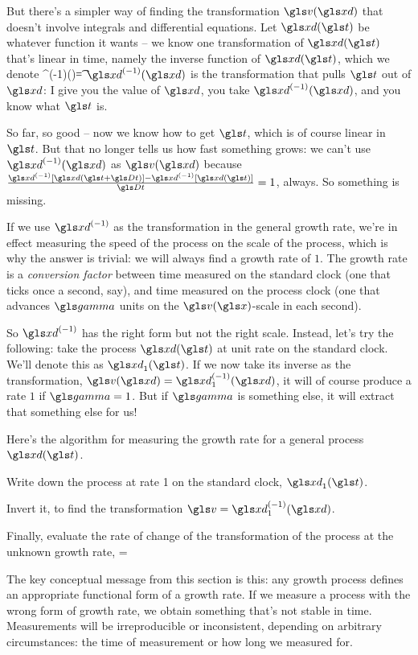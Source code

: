 But there's a simpler way of finding the transformation $\gv(\xd)$ that doesn't involve integrals and differential 
equations. Let $\xd(\t)$ be whatever function it wants -- we know one transformation of $\xd(\t)$ that's linear in 
time, namely the inverse function of $\xd(\t)$, which we denote 
\be
\xd^{(-1)}(\xd)=\t
\ee
$\xd^{(-1)}(\xd)$ is the transformation that pulls $\t$ out of $\xd$: I give you the value of $\xd$, you take 
$\xd^{(-1)}(\xd)$, and you know what $\t$ is.

So far, so good -- now we know how to get $\t$, which is of course linear in $\t$. But that no longer tells 
us how fast something grows: we can't use $\xd^{(-1)}(\xd)$ as $\gv(\xd)$ because 
$\frac{\xd^{(-1)}[\xd(\t+\Dt)]-\xd^{(-1)}[\xd(\t)]}{\Dt}=1$, always. So something is missing.

If we use $\xd^{(-1)}$ as the transformation in the general growth rate, we're in effect measuring the 
speed of the process on the scale of the process, which is why the answer is trivial: we will always 
find a growth rate of $1$.  The growth rate is a {\it conversion factor} between time measured on 
the standard clock (one that ticks once a second, say), and time measured on the process clock 
(one that advances $\ggamma$ units on the $\gv(\x)$-scale in each second). 

So $\xd^{(-1)}$ has the right form but not the right scale. Instead, let's try the following: take the process 
$\xd(\t)$ at unit rate on the standard clock. We'll denote this as $\xd_1(\t)$. If we now take its inverse as 
the transformation,  $\gv(\xd)=\xd_1^{(-1)}(\xd)$, it will of course produce a rate $1$ if $\ggamma=1$. 
But if $\ggamma$ is something else, it will extract that something else for us!

Here's the algorithm for measuring the growth rate for a general process $\xd(\t)$.
\bi
\item
Write down the process at rate 1 on the standard clock, $\xd_1(\t)$.
\item
Invert it, to find the transformation $\gv=\xd_1^{(-1)}(\xd)$.
\item
Finally, evaluate the rate of change of the transformation of the process at the unknown growth rate, 
\be
\g=
\ee
\ei

The key conceptual message from this section is this: any growth process defines an appropriate functional 
form of a growth rate. If we measure a process with the wrong form of growth rate, we obtain something 
that's not stable in time. Measurements will be irreproducible or inconsistent, depending on arbitrary 
circumstances: the time of measurement or how long we measured for. 

